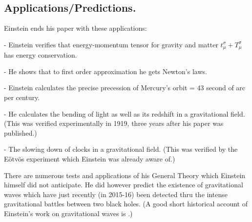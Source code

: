 \documentclass[12pt,reqno]{amsart}
\theoremstyle{definition}
\numberwithin{equation}{section}
\begin{document}
\medskip

\subsection{Applications/Predictions.} Einstein ends his paper with these applications:

- Einstein verifies that energy-momentum tensor for gravity and matter $t_\mu^\sigma + T_\mu^\sigma$ has energy conservation.

- He shows that to first order approximation he gets Newton's laws.

- Einstein calculates the precise precession of Mercury's orbit = 43 second of arc per century.

- He calculates the bending of light as well as its redshift in a gravitational field. (This was verified experimentally in 1919, three years after his paper was published.)

- The slowing down of clocks in a gravitational field. (This was verified by the E\"otv\"os experiment which Einstein was already aware of.)

There are numerous tests and applications of his General Theory which Einstein himself did not anticipate. He did however predict the existence of gravitational waves \cite{Einsteinwaves} which have just recently (in 2015-16) been detected thru the intense gravitational battles between two black holes. (A good short historical account of Einstein's work on gravitational waves is \cite{Weinstein}.)

\end{document}
